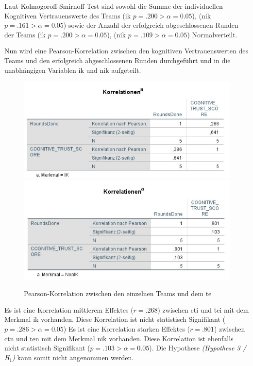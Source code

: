 \documentclass[a4paper,11pt]{article}%
\renewcommand{\\}{\vspace*{0.5\baselineskip} \newline}
\begin{document}
Laut Kolmogoroff-Smirnoff-Test sind sowohl die Summe der individuellen Kognitiven Vertrauenswerte des Teams (\ac{ik} $p = .200 > \alpha = 0.05$), (\ac{nik} $p = .161 > \alpha = 0.05$) sowie der Anzahl der erfolgreich abgeschlossenen Runden der Teams (\ac{ik} $p = .200 > \alpha = 0.05$), (\ac{nik} $p = .109 > \alpha = 0.05$) Normalverteilt.

Nun wird eine Pearson-Korrelation zwischen den kognitiven Vertrauenswerten des Teams und den erfolgreich abgeschlossenen Runden durchgeführt und in die unabhängigen Variablen \ac{ik} und \ac{nik} aufgeteilt.

\begin{figure}[H]
\centering
		\begin{footnotesize}
			\includegraphics[scale=0.8]{Abbildungen/Post_QuestionnaireStatistiks/H3_IK_Korrelation_Pearson}
			\includegraphics[scale=0.8]{Abbildungen/Post_QuestionnaireStatistiks/H3_NIK_Korrelation_Pearson}
			\caption{Pearson-Korrelation zwischen den einzelnen Teams und dem \ac{te}}
			\label{fig:Pearson_ik_nik_h3}
		\end{footnotesize}
	\end{figure}	

Es ist eine Korrelation mittlerem Effektes ($r = .268$) zwischen \ac{cti} und \ac{tei} mit dem Merkmal \ac{ik} vorhanden. Diese Korrelation ist nicht statistisch Signifikant ($p = .286 > \alpha = 0.05$)
Es ist eine Korrelation starken Effektes ($r = .801$) zwischen \ac{ctn} und \ac{ten} mit dem Merkmal \ac{nik} vorhanden. Diese Korrelation ist ebenfalls nicht statistisch Signifikant ($p = .103 > \alpha = 0.05$).
Die Hypothese \textit{(Hypothese 3 / H$_{1}$)} kann somit nicht angenommen werden.
\end{document}
